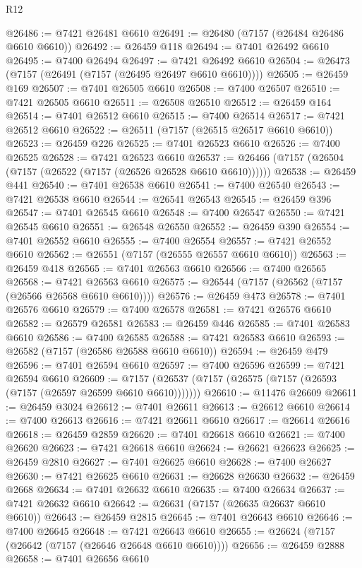 \begin{lexlean}{R12}
\begin{coremodule}
@26486 := @7421 @26481 @6610
@26491 := @26480 (@7157 (@26484 @26486 @6610 @6610))
@26492 := @26459 @118
@26494 := @7401 @26492 @6610
@26495 := @7400 @26494
@26497 := @7421 @26492 @6610
@26504 := @26473 (@7157 (@26491 (@7157 (@26495 @26497 @6610 @6610))))
@26505 := @26459 @169
@26507 := @7401 @26505 @6610
@26508 := @7400 @26507
@26510 := @7421 @26505 @6610
@26511 := @26508 @26510
@26512 := @26459 @164
@26514 := @7401 @26512 @6610
@26515 := @7400 @26514
@26517 := @7421 @26512 @6610
@26522 := @26511 (@7157 (@26515 @26517 @6610 @6610))
@26523 := @26459 @226
@26525 := @7401 @26523 @6610
@26526 := @7400 @26525
@26528 := @7421 @26523 @6610
@26537 := @26466 (@7157 (@26504 (@7157 (@26522 (@7157 (@26526 @26528 @6610 @6610))))))
@26538 := @26459 @441
@26540 := @7401 @26538 @6610
@26541 := @7400 @26540
@26543 := @7421 @26538 @6610
@26544 := @26541 @26543
@26545 := @26459 @396
@26547 := @7401 @26545 @6610
@26548 := @7400 @26547
@26550 := @7421 @26545 @6610
@26551 := @26548 @26550
@26552 := @26459 @390
@26554 := @7401 @26552 @6610
@26555 := @7400 @26554
@26557 := @7421 @26552 @6610
@26562 := @26551 (@7157 (@26555 @26557 @6610 @6610))
@26563 := @26459 @418
@26565 := @7401 @26563 @6610
@26566 := @7400 @26565
@26568 := @7421 @26563 @6610
@26575 := @26544 (@7157 (@26562 (@7157 (@26566 @26568 @6610 @6610))))
@26576 := @26459 @473
@26578 := @7401 @26576 @6610
@26579 := @7400 @26578
@26581 := @7421 @26576 @6610
@26582 := @26579 @26581
@26583 := @26459 @446
@26585 := @7401 @26583 @6610
@26586 := @7400 @26585
@26588 := @7421 @26583 @6610
@26593 := @26582 (@7157 (@26586 @26588 @6610 @6610))
@26594 := @26459 @479
@26596 := @7401 @26594 @6610
@26597 := @7400 @26596
@26599 := @7421 @26594 @6610
@26609 := @7157 (@26537 (@7157 (@26575 (@7157 (@26593 (@7157 (@26597 @26599 @6610 @6610)))))))
@26610 := @11476 @26609
@26611 := @26459 @3024
@26612 := @7401 @26611
@26613 := @26612 @6610
@26614 := @7400 @26613
@26616 := @7421 @26611 @6610
@26617 := @26614 @26616
@26618 := @26459 @2859
@26620 := @7401 @26618 @6610
@26621 := @7400 @26620
@26623 := @7421 @26618 @6610
@26624 := @26621 @26623
@26625 := @26459 @2810
@26627 := @7401 @26625 @6610
@26628 := @7400 @26627
@26630 := @7421 @26625 @6610
@26631 := @26628 @26630
@26632 := @26459 @2668
@26634 := @7401 @26632 @6610
@26635 := @7400 @26634
@26637 := @7421 @26632 @6610
@26642 := @26631 (@7157 (@26635 @26637 @6610 @6610))
@26643 := @26459 @2815
@26645 := @7401 @26643 @6610
@26646 := @7400 @26645
@26648 := @7421 @26643 @6610
@26655 := @26624 (@7157 (@26642 (@7157 (@26646 @26648 @6610 @6610))))
@26656 := @26459 @2888
@26658 := @7401 @26656 @6610

\end{coremodule}
\end{lexlean}

